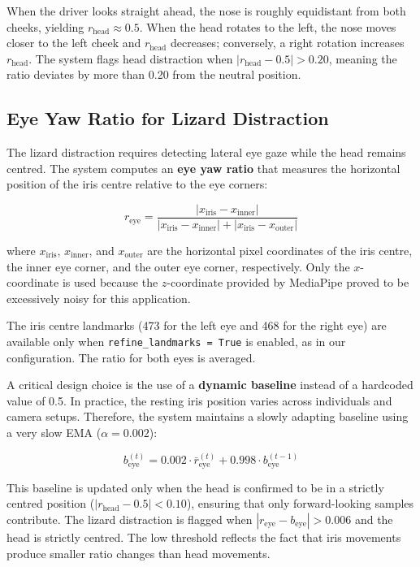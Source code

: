 \documentclass[12pt,a4paper]{article}
\begin{document}
When the driver looks straight ahead, the nose is roughly equidistant from both cheeks, yielding $r_{\text{head}} \approx 0.5$. When the head rotates to the left, the nose moves closer to the left cheek and $r_{\text{head}}$ decreases; conversely, a right rotation increases $r_{\text{head}}$. The system flags head distraction when $|r_{\text{head}} - 0.5| > 0.20$, meaning the ratio deviates by more than 0.20 from the neutral position.

\subsection{Eye Yaw Ratio for Lizard Distraction}\label{subsec:eyeyaw}

The lizard distraction requires detecting lateral eye gaze while the head remains centred. The system computes an \textbf{eye yaw ratio} that measures the horizontal position of the iris centre relative to the eye corners:

\begin{equation}\label{eq:eyeyaw}
    r_{\text{eye}} = \frac{|x_{\text{iris}} - x_{\text{inner}}|}{|x_{\text{iris}} - x_{\text{inner}}| + |x_{\text{iris}} - x_{\text{outer}}|}
\end{equation}

\noindent where $x_{\text{iris}}$, $x_{\text{inner}}$, and $x_{\text{outer}}$ are the horizontal pixel coordinates of the iris centre, the inner eye corner, and the outer eye corner, respectively. Only the $x$-coordinate is used because the $z$-coordinate provided by MediaPipe proved to be excessively noisy for this application.

The iris centre landmarks (473 for the left eye and 468 for the right eye) are available only when \texttt{refine\_landmarks = True} is enabled, as in our configuration. The ratio for both eyes is averaged.

A critical design choice is the use of a \textbf{dynamic baseline} instead of a hardcoded value of 0.5. In practice, the resting iris position varies across individuals and camera setups. Therefore, the system maintains a slowly adapting baseline using a very slow EMA ($\alpha = 0.002$):

\begin{equation}
    b_{\text{eye}}^{(t)} = 0.002 \cdot \bar{r}_{\text{eye}}^{(t)} + 0.998 \cdot b_{\text{eye}}^{(t-1)}
\end{equation}

This baseline is updated only when the head is confirmed to be in a strictly centred position ($|r_{\text{head}} - 0.5| < 0.10$), ensuring that only forward-looking samples contribute. The lizard distraction is flagged when $|r_{\text{eye}} - b_{\text{eye}}| > 0.006$ and the head is strictly centred. The low threshold reflects the fact that iris movements produce smaller ratio changes than head movements.
\end{document}
